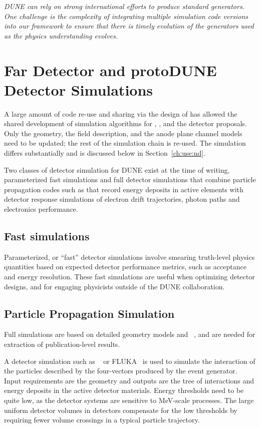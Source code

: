 \documentclass[../main-v1.tex]{subfiles}
\begin{document}
{\it DUNE can rely on strong international efforts to produce standard generators. One challenge is the complexity of integrating multiple simulation code versions into our framework to ensure that there is timely evolution of the generators used as the physics understanding evolves.}

\section{Far Detector and protoDUNE Detector Simulations}

A large amount of code re-use and sharing via the design of  has allowed the shared development of simulation algorithms for , , 
and the   detector proposals.  Only the geometry, the field description,  and the anode plane channel models need to be updated; the rest of the simulation chain is re-used.  The  simulation differs substantially and is discussed below in 
Section~\ref{ch:use:nd}.

Two classes of detector simulation for DUNE exist at the time of writing, parameterized fast simulations and full detector simulations that combine particle propagation codes such as  that record energy deposits in active elements with detector response simulations of electron drift trajectories, photon paths and electronics performance. 

\subsection{Fast simulations}
Parameterized, or ``fast'' detector simulations involve smearing truth-level physics quantities based on expected detector performance metrics, such as acceptance and energy resolution.  These fast simulations are useful when optimizing detector designs, and for engaging physicists outside of the DUNE collaboration.  

\subsection{Particle Propagation Simulation}
Full simulations are based on detailed geometry models and ~\cite{Agostinelli:2002hh,Allison:2016lfl}, and are needed for extraction of publication-level results.

A detector simulation such as ~\cite{Allison:2016lfl} or FLUKA~\cite{Bohlen:2014buj} is used to simulate the interaction of the particles described by the four-vectors produced by the event generator. Input requirements are the geometry and outputs are the tree of interactions and energy deposits in the active detector materials. 
Energy thresholds need to be quite low, as the detector systems are sensitive to MeV-scale processes. The large uniform detector volumes in  detectors compensate for the low thresholds by requiring fewer volume crossings in a typical particle trajectory.  
\end{document}
